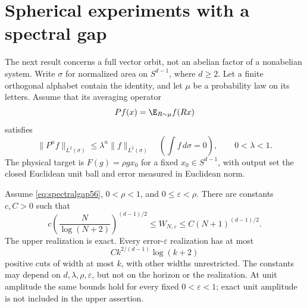 \section{Spherical experiments with a spectral gap}\label{sec:nonabelian56}
The next result concerns a full vector orbit, not an abelian factor of a nonabelian system. Write $\sigma$ for normalized area on $S^{d-1}$, where $d\ge2$. Let a finite orthogonal alphabet contain the identity, and let $\mu$ be a probability law on its letters. Assume that its averaging operator
\[
                  Pf(x)=\E_{R\sim\mu}f(Rx)
\]
satisfies
\begin{equation}\label{eq:spectralgap56}
        \|P^n f\|_{L^2(\sigma)}\le\lambda^n\|f\|_{L^2(\sigma)}
        \quad\left(\int f\,d\sigma=0\right),\qquad 0<\lambda<1.
\end{equation}
The physical target is $F(g)=\rho g x_0$ for a fixed $x_0\in S^{d-1}$, with output set the closed Euclidean unit ball and error measured in Euclidean norm.

\begin{theorem}\label{thm:spherical56}
Assume \eqref{eq:spectralgap56}, $0<\rho<1$, and $0\le\varepsilon<\rho$. There are constants $c,C>0$ such that
\begin{equation}\label{eq:sphericalrate56}
 c\left(\frac{N}{\log(N+2)}\right)^{(d-1)/2}
       \le W_{N,\varepsilon}\le C(N+1)^{(d-1)/2}.
\end{equation}
The upper realization is exact. Every error-$\varepsilon$ realization has at most
\[
                      C k^{2/(d-1)}\log(k+2)
\]
positive cuts of width at most $k$, with other widths unrestricted. The constants may depend on $d,\lambda,\rho,\varepsilon$, but not on the horizon or the realization. At unit amplitude the same bounds hold for every fixed $0<\varepsilon<1$; exact unit amplitude is not included in the upper assertion.
\end{theorem}

